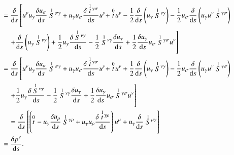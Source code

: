 \begin{align}
&\quad = \cd{} \left[ u^{\nu} u_{\gamma} \cd{u_{\sigma}} \des{1}{S}^{\sigma \gamma} + u_{\gamma} u_{\sigma} \cd{\des{1}{t}^{\gamma \sigma}} u^{\nu} + \des{0}{t} u^{\nu} - \frac{1}{2} \cd{} \left(       u_{\gamma} \des{1}{S}^{\nu \gamma} \right) - \frac{1}{2} u_{\sigma} \cd{} \left( u_{\gamma} u^{\nu} \des{1}{S}^{\gamma \sigma} \right) \right. \nonumber \\
&\qquad \left. + \cd{}\left( u_{\gamma} \des{1}{S}^{\nu \gamma} \right) + \frac{1}{2} u_{\gamma} \cd{\des{1}{S}^{\nu \gamma}} - \frac{1}{2} \des{1}{S}^{\nu \gamma} \cd{u_{\gamma}} + \frac{1}{2} \cd{u_{\gamma}} u_{\sigma} \des{1}{S}^{\gamma \sigma} u^{\nu} \right] \nonumber\\
&\quad = \cd{} \left[ u^{\nu} u_{\gamma} \cd{u_{\sigma}} \des{1}{S}^{\sigma \gamma} + u_{\gamma} u_{\sigma} \cd{\des{1}{t}^{\gamma \sigma}} u^{\nu} + \des{0}{t} u^{\nu} + \frac{1}{2} \cd{} \left(       u_{\gamma} \des{1}{S}^{\nu \gamma} \right) - \frac{1}{2} u_{\sigma} \cd{} \left( u_{\gamma} u^{\nu} \des{1}{S}^{\gamma \sigma} \right) \right. \nonumber \\
&\qquad \left. +\frac{1}{2} u_{\gamma} \cd{\des{1}{S}^{\nu \gamma}} - \frac{1}{2} \des{1}{S}^{\nu \gamma} \cd{u_{\gamma}} + \frac{1}{2} \cd{u_{\gamma}} u_{\sigma} \des{1}{S}^{\gamma \sigma} u^{\nu} \right] \nonumber\\
& \qquad= \cd{} \left[ \left( \des{0}{t} - u_{\gamma} \cd{u_{\rho}} \des{1}{S}^{\gamma \rho} + u_{\gamma} u_{\rho} \cd{\des{1}{t}^{\gamma \rho}} \right) u^{\mu} + u_{\gamma} \cd{} \des{1}{S}^{\mu \gamma} \right] \nonumber\\
\label{eq:92}
&\quad = \cd{p^{\nu}}.
\end{align}


